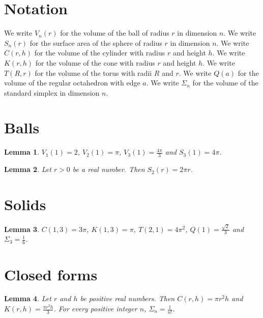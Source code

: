 \documentclass{article}
\newtheorem{lemma}{Lemma}
\begin{document}
\section{Notation}

We write $V_n(r)$ for the volume of the ball of radius $r$ in dimension $n$.
We write $S_n(r)$ for the surface area of the sphere of radius $r$ in dimension $n$.
We write $C(r,h)$ for the volume of the cylinder with radius $r$ and height $h$.
We write $K(r,h)$ for the volume of the cone with radius $r$ and height $h$.
We write $T(R,r)$ for the volume of the torus with radii $R$ and $r$.
We write $Q(a)$ for the volume of the regular octahedron with edge $a$.
We write $\Sigma_n$ for the volume of the standard simplex in dimension $n$.

\section{Balls}

\begin{lemma}\label{balls}
$V_1(1)=2$, $V_2(1)=\pi$, $V_3(1)=\frac{4\pi}{3}$ and $S_3(1)=4\pi$.
\end{lemma}

\begin{lemma}\label{derivative}
Let $r>0$ be a real number. Then $S_2(r)=2\pi r$.
\end{lemma}

\section{Solids}

\begin{lemma}\label{solids}
$C(1,3)=3\pi$, $K(1,3)=\pi$, $T(2,1)=4\pi^2$, $Q(1)=\frac{\sqrt2}{3}$ and $\Sigma_3=\frac16$.
\end{lemma}

\section{Closed forms}

\begin{lemma}\label{closed}
Let $r$ and $h$ be positive real numbers. Then $C(r,h)=\pi r^2h$ and $K(r,h)=\frac{\pi r^2h}{3}$. For every positive integer $n$, $\Sigma_n=\frac{1}{n!}$.
\end{lemma}
\end{document}
